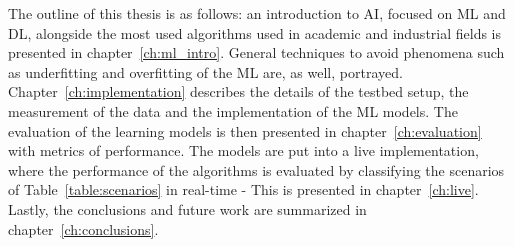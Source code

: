 The outline of this thesis is as follows: an introduction to \ac{AI}, focused on \ac{ML} and \ac{DL}, alongside the most used algorithms used in academic and industrial fields is presented in chapter~\ref{ch:ml_intro}. General techniques to avoid phenomena such as underfitting and overfitting of the \ac{ML} are, as well, portrayed. Chapter~\ref{ch:implementation} describes the details of the testbed setup, the measurement of the data and the implementation of the \ac{ML} models. The evaluation of the learning models is then presented in chapter~\ref{ch:evaluation} with metrics of performance. The models are put into a live implementation, where the performance of the algorithms is evaluated by classifying the scenarios of Table~\ref{table:scenarios} in real-time - This is presented in chapter~\ref{ch:live}. Lastly, the conclusions and future work are summarized in chapter~\ref{ch:conclusions}.
